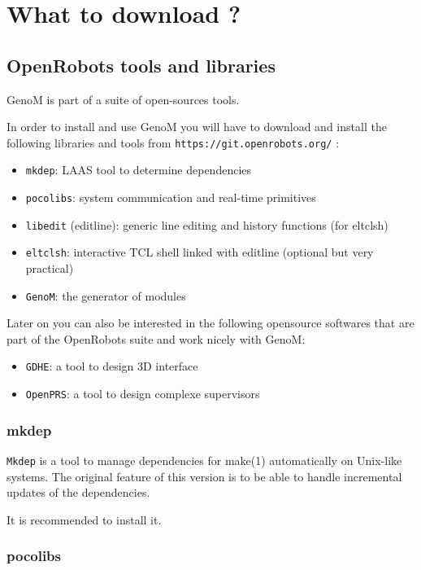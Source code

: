 \section{What to download ?}
\label{sec|configuration|download}

\subsection{OpenRobots tools and libraries}

GenoM is part of a suite of open-sources tools. 

In order to install and use GenoM you will have to download and install
the following libraries and tools from  
\texttt{https://git.openrobots.org/} :

\begin{itemize}
\item \texttt{mkdep}: LAAS tool to determine dependencies
\item \texttt{pocolibs}: system communication and real-time primitives
\item \texttt{libedit} (editline): generic line editing and history
functions (for eltclsh)
\item \texttt{eltclsh}: interactive TCL shell linked with editline (optional but very practical)
\item \texttt{GenoM}: the generator of modules
\end{itemize}

Later on you can also be interested in the following opensource softwares
that are part of the OpenRobots suite and work nicely with GenoM:

\begin{itemize}
\item \texttt{GDHE}: a tool to design 3D interface
\item \texttt{OpenPRS}: a tool to design complexe supervisors
\end{itemize}

\subsubsection{mkdep}

\texttt{Mkdep} is a tool to manage dependencies for make(1) automatically on
Unix-like systems.  The original feature of this version is to be able to
handle incremental updates of the dependencies.

It is recommended to install it.

\subsubsection{pocolibs}

